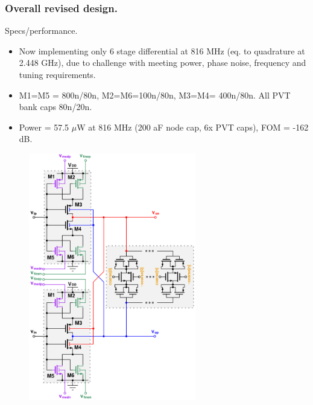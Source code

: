 \documentclass[t, screen, aspectratio=43]{beamer}
\begin{document}
\begin{frame}
	\frametitle{Overall revised design.}
	\begin{block}{Specs/performance.}
		\begin{minipage}{6cm}
			\vspace{1em}
			\tiny

			\begin{itemize}[itemsep=4pt,label=\protect---]
				\item Now implementing only 6 stage differential at 816 MHz (eq. to quadrature at 2.448 GHz), due to challenge with meeting power, phase noise, frequency and tuning requirements.
				\item M1=M5 = 800n/80n, M2=M6=100n/80n, M3=M4= 400n/80n. All PVT bank caps 80n/20n.
				\item Power = 57.5 $\mu$W at 816 MHz (200 aF node cap, 6x PVT caps), FOM = -162 dB. 
			\end{itemize}

		\end{minipage}%
		\begin{minipage}{6cm}
			\begin{figure}[htb!]
			        \centering
			        \includegraphics[width=0.65\textwidth, angle=0]{telescopic_pseudodiff_delay_cell_all_tune2}
			\end{figure}
		\end{minipage}%

	\end{block}	
\end{frame}
\end{document}

